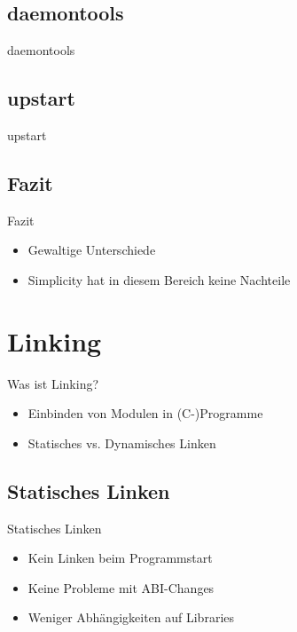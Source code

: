 \documentclass{beamer}
\begin{document}
\subsection{daemontools}
\begin{frame}{daemontools}
	
\end{frame}

\subsection{upstart}
\begin{frame}{upstart}
	
\end{frame}

\subsection{Fazit}
\begin{frame}{Fazit}
	\begin{itemize}
		\item Gewaltige Unterschiede
		\pause \item Simplicity hat in diesem Bereich keine Nachteile
	\end{itemize}
\end{frame}

\section{Linking}
\begin{frame}{Was ist Linking?}
	\begin{itemize}
		\item Einbinden von Modulen in (C-)Programme
		\pause \item Statisches vs. Dynamisches Linken
	\end{itemize}
\end{frame}

\subsection{Statisches Linken}
\begin{frame}{Statisches Linken}
	\begin{itemize}
		\item Kein Linken beim Programmstart
		\pause \item Keine Probleme mit ABI-Changes
		\pause \item Weniger Abhängigkeiten auf Libraries
	\end{itemize}
\end{frame}
\end{document}
